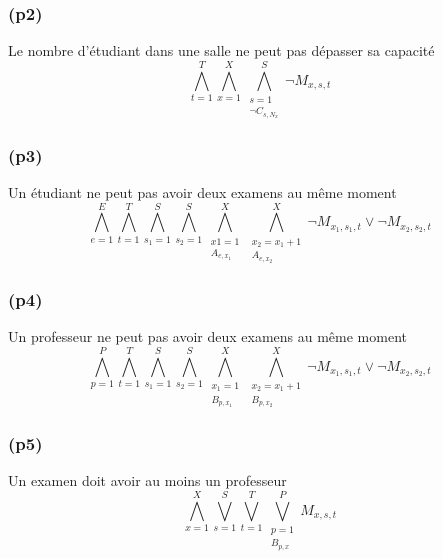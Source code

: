 \documentclass[a4paper,11pt]{article}
\begin{document}
\subsubsection{(p2)}
Le nombre d'étudiant dans une salle ne peut pas dépasser sa capacité
\begin{displaymath}
	\bigwedge\limits_{t=1}^{T}\bigwedge\limits_{x=1}^{X}\bigwedge\limits_{\substack{s=1 \\ \neg C_{s,N_{x}}}}^{S}  \neg M_{x,s,t}
\end{displaymath}

\subsubsection{(p3)}
Un étudiant ne peut pas avoir deux examens au même moment
\begin{displaymath}
\bigwedge\limits_{e=1}^{E}\bigwedge\limits_{t=1}^{T}\bigwedge\limits_{s_{1}=1}^{S}\bigwedge\limits_{s_{2}=1}^{S}\bigwedge\limits_{\substack{x1=1 \\ A_{e,x_{1}}}}^{X}\bigwedge\limits_{\substack{x_{2}=x_{1}+1 \\ A_{e,x_{2}}}}^{X} \neg M_{x_{1}, s_{1}, t} \vee \neg M_{x_{2}, s_{2}, t}
\end{displaymath}

\subsubsection{(p4)}
Un professeur ne peut pas avoir deux examens au même moment
\begin{displaymath}
\bigwedge\limits_{p=1}^{P}\bigwedge\limits_{t=1}^{T}\bigwedge\limits_{s_{1}=1}^{S}\bigwedge\limits_{s_{2}=1}^{S}\bigwedge\limits_{\substack{x_{1}=1 \\ B_{p,x_{1}}}}^{X}\bigwedge\limits_{\substack{x_{2}=x_{1}+1 \\ B_{p,x_{2}}}}^{X} \neg M_{x_{1}, s_{1}, t} \vee \neg M_{x_{2}, s_{2}, t}
\end{displaymath}

\subsubsection{(p5)}
Un examen doit avoir au moins un professeur
\begin{displaymath}
\bigwedge\limits_{x=1}^{X}\bigvee\limits_{s=1}^{S}\bigvee\limits_{t=1}^{T}\bigvee\limits_{\substack{p=1 \\ B_{p,x}}}^{P} M_{x, s, t}
\end{displaymath}
\end{document}

